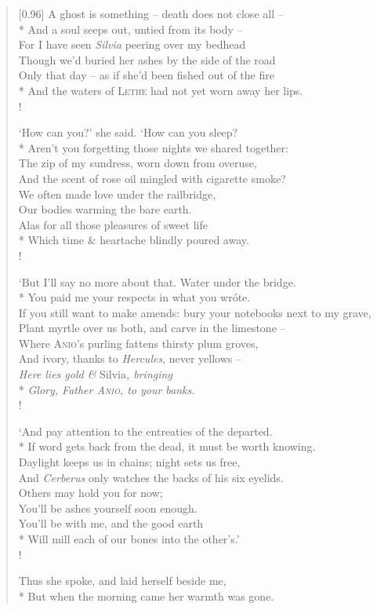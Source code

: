 \begin{verse}[0.96\textwidth]
A ghost is something -- death does not close all --\\*
\vin And a soul seeps out, untied from its body --\\
For I have seen \textit{Silvia} peering over my bedhead\\
\vin Though we'd buried her ashes by the side of the road\\
Only that day -- as if she'd been fished out of the fire\\*
\vin And the waters of \textsc{Lethe} had not yet worn away her lips.\\!

`How can you?' she said. `How can you sleep?\\*
\vin Aren't you forgetting those nights we shared together:\nobreak\\
The zip of my sundress, worn down from overuse,\\
\vin And the scent of rose oil mingled with cigarette smoke?\\
We often made love under the railbridge,\\
\vin Our bodies warming the bare earth.\\
Alas for all those pleasures of sweet life\\*
\vin Which time \& heartache blindly poured away.\\!

`But I'll say no more about that. Water under the bridge.\nobreak\\*
\vin You paid me your respects in what you wr\'ote.\\
If you still want to make amends: bury your notebooks next to my grave,\\
\vin Plant myrtle over us both, and carve in the limestone --\\
Where \textsc{Anio}'s purling fattens thirsty plum groves,\\
\vin And ivory, thanks to \textit{Hercules}, never yellows --\\
\textit{Here lies gold \& }Silvia\textit{, bringing}\\*
\vin \textit{Glory, Father \textsc{Anio}, to your banks.}\\!

`And pay attention to the entreaties of the departed.\\*
\vin If word gets back from the dead, it must be worth knowing.\\
Daylight keeps us in chains; night sets us free,\\
\vin And \textit{Cerberus} only watches the backs of his six eyelids.\nobreak\\
Others may hold you for now;\\
\vin You'll be ashes yourself soon enough.\\
You'll be with me, and the good earth\\*
\vin Will mill each of our bones into the other's.'\\!

Thus she spoke, and laid herself beside me,\\*
\vin But when the morning came her warmth was gone.
\end{verse}
